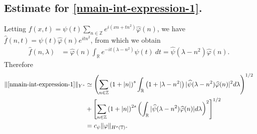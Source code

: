\documentclass[12pt,reqno]{amsart}
\numberwithin{equation}{section}  %
\newcommand{\rr}{\mathbb{R}}
\newcommand{\zz}{\mathbb{Z}}
\newcommand{\ci}{\mathbb{T}}
\newcommand{\wh}{\widehat}
\newcommand{\vp}{\varphi}
\begin{document}
\subsection{Estimate for \eqref{nmain-int-expression-1}.}
%
%
Letting $f(x,t) = \psi(t) \sum_{n \in \zz} e^{i(xn + tn^{2})} 
\wh{\vp}(n)$, we have \\ $\wh{f}(n,t) = \psi(t) \wh{\vp}(n) e^{itn^{2}}$,
from which we obtain
%
%
\begin{equation}
	\label{nfourier-trans-calc}
	\begin{split}
		\wh{f}(n, \lambda)
		& = \wh{\vp}(n) \int_\rr e^{-it( \lambda - n^{2})} 
		\psi(t) \ d t
    = \wh{\psi}(\lambda - n^{2}) \wh{\vp}(n).
	\end{split}
\end{equation}
%
%
%
%
%
%
Therefore
%
\begin{equation}
	\begin{split}
	\label{nmain-int1-est}
		\|\eqref{nmain-int-expression-1}\|_{Y^s}
		& \simeq \left (  \sum_{n\in \zz} \left (1 + |n| \right )^s \int_\rr \left( 1 + | \lambda - n^{2} 
		| \right )
    | \wh{\psi}(\lambda - n^{2}) \wh{\vp}(n) |^2 d \lambda \right)^{1/2} 
		\\
		& + \left[ \sum_{n \in \zz }\left( 1 + | n | \right)^{2s} \left( \int_{\rr} |
    \wh{\psi}(\lambda - n^{2})\wh{\vp}(n) | d \lambda
		\right)^{2} \right]^{1/2}
		\\
    & = c_{\psi}
		\|\vp\|_{H^s(\ci)}.
	\end{split}
\end{equation}
%
%
%
%
\end{document}
